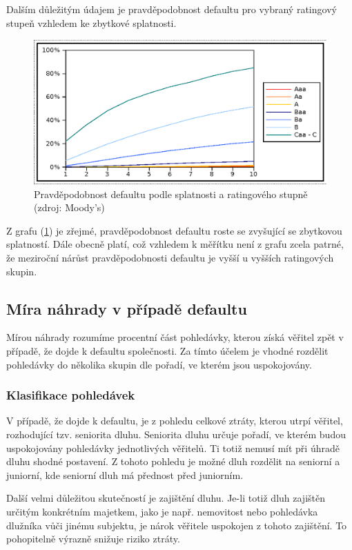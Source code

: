 \documentclass[a4paper]{book}
\begin{document}
Dalším důležitým údajem je pravděpodobnost defaultu pro vybraný ratingový stupeň vzhledem ke zbytkové splatnosti.
\begin{figure}
  \centering
  \includegraphics[bb=0 0 350 250]{probability_of_default.eps}
  \caption{Pravděpodobnost defaultu podle splatnosti a ratingového stupně (zdroj: Moody's)}
  \label{probability_of_default}
\end{figure}

Z grafu (\ref{probability_of_default}) je zřejmé, pravděpodobnost defaultu roste se zvyšující se zbytkovou splatností. Dále obecně platí, což vzhledem k měřítku není z grafu zcela patrné, že meziroční nárůst pravděpodobnosti defaultu je vyšší u vyšších ratingových skupin.

\subsection{Míra náhrady v případě defaultu}

Mírou náhrady rozumíme procentní část pohledávky, kterou získá věřitel zpět v případě, že dojde k defaultu společnosti. Za tímto účelem je vhodné rozdělit pohledávky do několika skupin dle pořadí, ve kterém jsou uspokojovány.

\subsubsection{Klasifikace pohledávek}

V případě, že dojde k defaultu, je z pohledu celkové ztráty, kterou utrpí věřitel, rozhodující tzv. seniorita dluhu. Seniorita dluhu určuje pořadí, ve kterém budou uspokojovány pohledávky jednotlivých věřitelů. Ti totiž nemusí mít při úhradě dluhu shodné postavení. Z tohoto pohledu je možné dluh rozdělit na seniorní a juniorní, kde seniorní dluh má přednost před juniorním.

Další velmi důležitou skutečností je zajištění dluhu. Je-li totiž dluh zajištěn určitým konkrétním majetkem, jako je např. nemovitost nebo pohledávka dlužníka vůči jinému subjektu, je nárok věřitele uspokojen z tohoto zajištění. To pohopitelně výrazně snižuje riziko ztráty.
\end{document}
